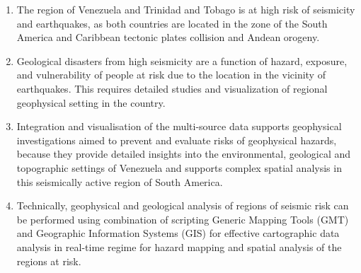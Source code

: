 \documentclass[sustainability,article,submit,pdftex,moreauthors]{Definitions/mdpi}
\begin{document}
\begin{enumerate}
  \item The region of Venezuela and Trinidad and Tobago is at high risk of seismicity and earthquakes, as both countries are located in the zone of the South America and Caribbean tectonic plates collision and Andean orogeny. 
  \item Geological disasters from high seismicity are a function of hazard, exposure, and vulnerability of people at risk due to the location in the vicinity of earthquakes. This requires detailed studies and visualization of regional geophysical setting in the country.
  \item Integration and visualisation of the multi-source data supports geophysical investigations aimed to prevent and evaluate risks of geophysical hazards, because they provide detailed insights into the environmental, geological and topographic settings of Venezuela and supports complex spatial analysis in this seismically active region of South America. 
  \item Technically, geophysical and geological analysis of regions of seismic risk can be performed using combination of scripting Generic Mapping Tools (GMT) and Geographic Information Systems (GIS) for effective cartographic data analysis in real-time regime for hazard mapping and spatial analysis of the regions at risk.
\end{enumerate}

\vspace{6pt} 




\end{document}
